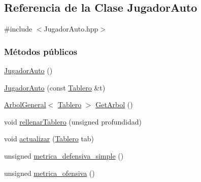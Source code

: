 \hypertarget{classJugadorAuto}{\subsection{Referencia de la Clase Jugador\-Auto}
\label{classJugadorAuto}
}


{\ttfamily \#include $<$Jugador\-Auto.\-hpp$>$}

\subsubsection*{Métodos públicos}
\begin{DoxyCompactItemize}
\item 
\hyperlink{classJugadorAuto_a28f4b4c52165488379729d71237a41a9}{Jugador\-Auto} ()
\item 
\hyperlink{classJugadorAuto_a0c2bc2690a8e6ba93b05a83b9310a03e}{Jugador\-Auto} (const \hyperlink{classTablero}{Tablero} \&t)
\item 
\hyperlink{classArbolGeneral}{Arbol\-General}$<$ \hyperlink{classTablero}{Tablero} $>$ \hyperlink{classJugadorAuto_a74531aa932becde453fe8667f6455413}{Get\-Arbol} ()
\item 
void \hyperlink{classJugadorAuto_a037135d5bad9b9ce107f3d1aeb63b1df}{rellenar\-Tablero} (unsigned profundidad)
\item 
void \hyperlink{classJugadorAuto_ac1c2056f753f8f09d2acf9a72e822fb2}{actualizar} (\hyperlink{classTablero}{Tablero} tab)
\item 
unsigned \hyperlink{classJugadorAuto_ab73b8f7888e024b14391fc5392597fdd}{metrica\-\_\-defensiva\-\_\-simple} ()
\item 
unsigned \hyperlink{classJugadorAuto_a0a49b8f33fafc9ef328c781472f3017a}{metrica\-\_\-ofensiva} ()
\end{DoxyCompactItemize}
